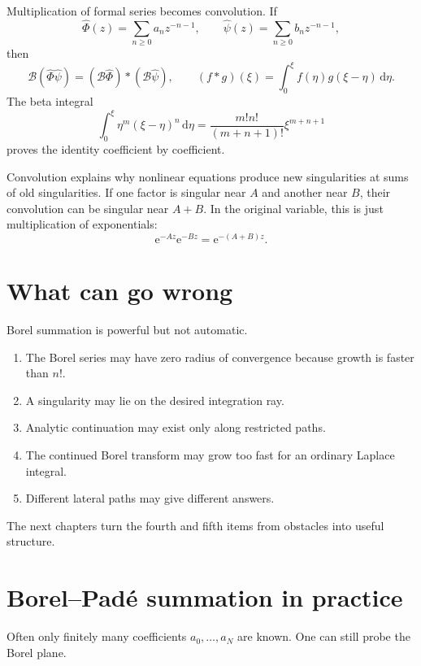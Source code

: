 \documentclass[11pt,oneside]{book}
\theoremstyle{definition}
\theoremstyle{remark}
\newcommand{\Borel}{\mathcal{B}}
\newcommand{\e}{\mathrm{e}}
\newcommand{\dd}{\,\mathrm{d}}
\newcommand{\phihat}{\widehat{\Phi}}
\begin{document}
Multiplication of formal series becomes convolution. If
\[
  \phihat(z)=\sum_{n\ge0}a_n z^{-n-1},
  \qquad
  \widehat\psi(z)=\sum_{n\ge0}b_n z^{-n-1},
\]
then
\begin{equation}
  \Borel(\phihat\widehat\psi)
  =(\Borel\phihat)*(\Borel\widehat\psi),
  \qquad
  (f*g)(\xi)=\int_0^\xi f(\eta)g(\xi-\eta)\dd\eta.
  \label{eq:borel-convolution}
\end{equation}
The beta integral
\[
  \int_0^\xi \eta^m(\xi-\eta)^n\dd\eta
  =\frac{m!n!}{(m+n+1)!}\xi^{m+n+1}
\]
proves the identity coefficient by coefficient.

Convolution explains why nonlinear equations produce new singularities at sums
of old singularities. If one factor is singular near $A$ and another near $B$,
their convolution can be singular near $A+B$. In the original variable, this is
just multiplication of exponentials:
\[
  \e^{-Az}\e^{-Bz}=\e^{-(A+B)z}.
\]

\section{What can go wrong}

Borel summation is powerful but not automatic.

\begin{enumerate}
\item The Borel series may have zero radius of convergence because growth is
faster than $n!$.
\item A singularity may lie on the desired integration ray.
\item Analytic continuation may exist only along restricted paths.
\item The continued Borel transform may grow too fast for an ordinary Laplace
integral.
\item Different lateral paths may give different answers.
\end{enumerate}

The next chapters turn the fourth and fifth items from obstacles into useful
structure.

\section{Borel--Pad\'e summation in practice}

Often only finitely many coefficients $a_0,\ldots,a_N$ are known. One can still
probe the Borel plane.
\end{document}
